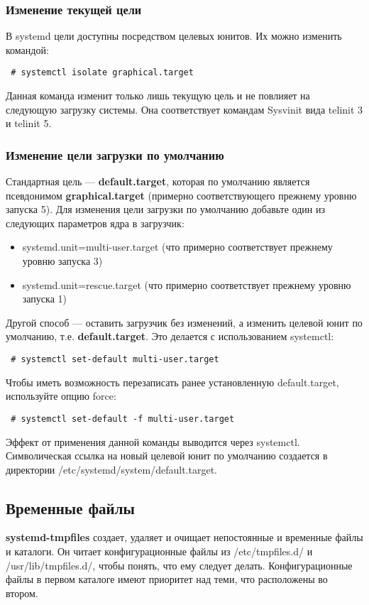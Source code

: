 \documentclass[a4paper,10pt,twoside]{article}
\begin{document}
\subsubsection{Изменение текущей цели}
В systemd цели доступны посредством целевых юнитов. Их можно изменить командой:

\begin{verbatim}
 # systemctl isolate graphical.target
\end{verbatim} 

Данная команда изменит только лишь текущую цель и не повлияет на следующую загрузку системы. Она соответствует командам Sysvinit вида telinit 3 и telinit 5.

\subsubsection{Изменение цели загрузки по умолчанию}
Стандартная цель — \textbf{default.target}, которая по умолчанию является псевдонимом \textbf{graphical.target} (примерно соответствующего прежнему уровню запуска 5). Для изменения цели загрузки по умолчанию добавьте один из следующих параметров ядра в загрузчик:

\begin{itemize}
 \item systemd.unit=multi-user.target (что примерно соответствует прежнему уровню запуска 3)
\item systemd.unit=rescue.target (что примерно соответствует прежнему уровню запуска 1)
\end{itemize}

Другой способ — оставить загрузчик без изменений, а изменить целевой юнит по умолчанию, т.е. \textbf{default.target}. Это делается с использованием systemctl:
\begin{verbatim}
 # systemctl set-default multi-user.target
\end{verbatim} 

Чтобы иметь возможность перезаписать ранее установленную default.target, используйте опцию force:
\begin{verbatim}
 # systemctl set-default -f multi-user.target
\end{verbatim} 

Эффект от применения данной команды выводится через systemctl. Символическая ссылка на новый целевой юнит по умолчанию создается в директории /etc/systemd/system/default.target.

\subsection{Временные файлы}
\textbf{systemd-tmpfiles} создает, удаляет и очищает непостоянные и временные файлы и каталоги. Он читает конфигурационные файлы из /etc/tmpfiles.d/ и /usr/lib/tmpfiles.d/, чтобы понять, что ему следует делать. Конфигурационные файлы в первом каталоге имеют приоритет над теми, что расположены во втором.
\end{document}
